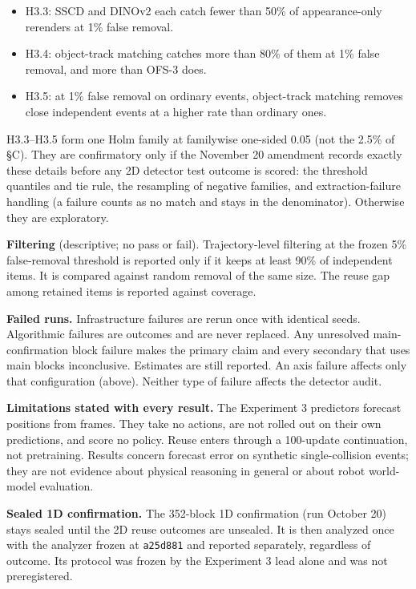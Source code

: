 \documentclass[10pt,letterpaper]{article}
\providecommand{\tightlist}{\setlength{\itemsep}{0pt}\setlength{\parskip}{0pt}}
\begin{document}
\begin{itemize}
\tightlist
\item
  H3.3: SSCD and DINOv2 each catch fewer than 50\% of
  appearance-only rerenders at 1\% false removal.
\item
  H3.4: object-track matching catches more than 80\% of them
  at 1\% false removal, and more than OFS-3 does.
\item
  H3.5: at 1\% false removal on ordinary events,
  object-track matching removes close independent events at
  a higher rate than ordinary ones.
\end{itemize}

H3.3--H3.5 form one Holm family at familywise one-sided 0.05
(not the 2.5\% of §C). They are confirmatory only if the
November 20 amendment records exactly these details before
any 2D detector test outcome is scored: the threshold
quantiles and tie rule, the resampling of negative families,
and extraction-failure handling (a failure counts as no
match and stays in the denominator). Otherwise they are
exploratory.

\textbf{Filtering} (descriptive; no pass or fail).
Trajectory-level filtering at the frozen 5\% false-removal
threshold is reported only if it keeps at least 90\% of
independent items. It is compared against random removal of
the same size. The reuse gap among retained items is
reported against coverage.

\textbf{Failed runs.} Infrastructure failures are rerun once
with identical seeds. Algorithmic failures are outcomes and
are never replaced. Any unresolved main-confirmation block
failure makes the primary claim and every secondary that
uses main blocks inconclusive. Estimates are still reported.
An axis failure affects only that configuration (above).
Neither type of failure affects the detector audit.

\textbf{Limitations stated with every result.} The
Experiment 3 predictors forecast positions from frames. They
take no actions, are not rolled out on their own
predictions, and score no policy. Reuse enters through a
100-update continuation, not pretraining. Results concern
forecast error on synthetic single-collision events; they
are not evidence about physical reasoning in general or
about robot world-model evaluation.

\textbf{Sealed 1D confirmation.} The 352-block 1D
confirmation (run October 20) stays sealed until the 2D
reuse outcomes are unsealed. It is then analyzed once with
the analyzer frozen at \texttt{a25d881} and reported
separately, regardless of outcome. Its protocol was frozen
by the Experiment 3 lead alone and was not preregistered.
\end{document}

